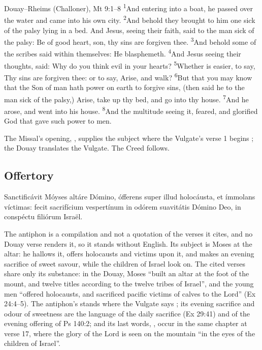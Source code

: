 \begin{englishwitness}{Douay--Rheims (Challoner), Mt 9:1--8}
\textsuperscript{1}And entering into a boat, he passed over the water and came
into his own city. \textsuperscript{2}And behold they brought to him one sick
of the palsy lying in a bed. And Jesus, seeing their faith, said to the man
sick of the palsy: Be of good heart, son, thy sins are forgiven thee.
\textsuperscript{3}And behold some of the scribes said within themselves: He
blasphemeth. \textsuperscript{4}And Jesus seeing their thoughts, said: Why do
you think evil in your hearts? \textsuperscript{5}Whether is easier, to say,
Thy sins are forgiven thee: or to say, Arise, and walk?
\textsuperscript{6}But that you may know that the Son of man hath power on
earth to forgive sins, (then said he to the man sick of the palsy,) Arise,
take up thy bed, and go into thy house. \textsuperscript{7}And he arose, and
went into his house. \textsuperscript{8}And the multitude seeing it, feared,
and glorified God that gave such power to men.
\end{englishwitness}

\noindent The Missal's opening, , supplies the subject where the Vulgate's verse 1 begins ; the Douay translates the Vulgate. The Creed follows.

\subsection{Offertory}
\label{proper-offertory}


\begin{latinproper}
Sanctificávit Móyses altáre Dómino, ófferens super illud holocáusta, et
ímmolans víctimas: fecit sacrifícium vespertínum in odórem suavitátis Dómino
Deo, in conspéctu filiórum Israël.
\end{latinproper}

\noindent The antiphon is a compilation and not a quotation of the verses it
cites, and no Douay verse renders it, so it stands without English. Its
subject is Moses at the altar: he hallows it, offers holocausts and victims
upon it, and makes an evening sacrifice of sweet savour, while the children of
Israel look on. The cited
verses share only its substance: in the Douay, Moses ``built an altar at the
foot of the mount, and twelve titles according to the twelve tribes of
Israel'', and the young men ``offered holocausts, and sacrificed pacific
victims of calves to the Lord'' (Ex 24:4--5). The antiphon's
 stands where the Vulgate says ; its
evening sacrifice and odour of sweetness are the language of the daily
sacrifice (Ex 29:41) and of the evening offering of Ps 140:2; and its last
words, , occur in the same chapter at
verse 17, where the glory of the Lord is seen on the mountain ``in the eyes of
the children of Israel''.

